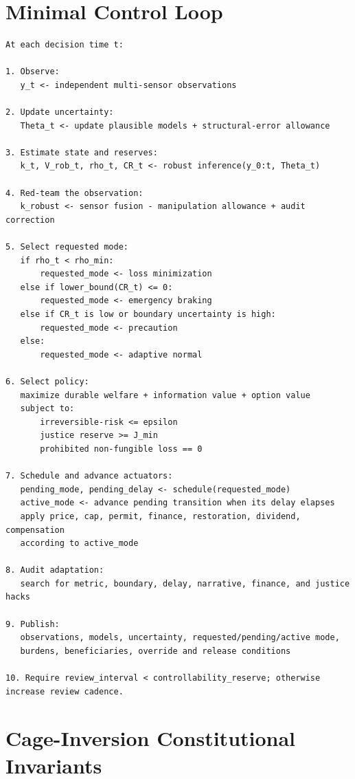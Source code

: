 \documentclass[11pt,a4paper]{article}
\numberwithin{equation}{section}
\theoremstyle{definition}
\theoremstyle{plain}
\theoremstyle{remark}
\begin{document}
\section{Minimal Control Loop}

\begin{lstlisting}[style=paperpseudo]
At each decision time t:

1. Observe:
   y_t <- independent multi-sensor observations

2. Update uncertainty:
   Theta_t <- update plausible models + structural-error allowance

3. Estimate state and reserves:
   k_t, V_rob_t, rho_t, CR_t <- robust inference(y_0:t, Theta_t)

4. Red-team the observation:
   k_robust <- sensor fusion - manipulation allowance + audit correction

5. Select requested mode:
   if rho_t < rho_min:
       requested_mode <- loss minimization
   else if lower_bound(CR_t) <= 0:
       requested_mode <- emergency braking
   else if CR_t is low or boundary uncertainty is high:
       requested_mode <- precaution
   else:
       requested_mode <- adaptive normal

6. Select policy:
   maximize durable welfare + information value + option value
   subject to:
       irreversible-risk <= epsilon
       justice reserve >= J_min
       prohibited non-fungible loss == 0

7. Schedule and advance actuators:
   pending_mode, pending_delay <- schedule(requested_mode)
   active_mode <- advance pending transition when its delay elapses
   apply price, cap, permit, finance, restoration, dividend, compensation
   according to active_mode

8. Audit adaptation:
   search for metric, boundary, delay, narrative, finance, and justice hacks

9. Publish:
   observations, models, uncertainty, requested/pending/active mode,
   burdens, beneficiaries, override and release conditions

10. Require review_interval < controllability_reserve; otherwise increase review cadence.
\end{lstlisting}

\section{Cage-Inversion Constitutional Invariants}
\end{document}
